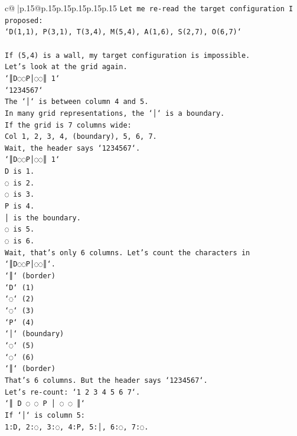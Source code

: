 \documentclass{article}
\begin{document}
{\begin{supertabular}{c@{$\;$}|p{.15\linewidth}@{}p{.15\linewidth}p{.15\linewidth}p{.15\linewidth}p{.15\linewidth}p{.15\linewidth}}
{{{\texttt{Let me re{-}read the target configuration I proposed:} \\
\texttt{`D(1,1), P(3,1), T(3,4), M(5,4), A(1,6), S(2,7), O(6,7)`} \\
\\ 
\texttt{If (5,4) is a wall, my target configuration is impossible.} \\
\texttt{Let's look at the grid again.} \\
\texttt{`║D◌◌P│◌◌║ 1`} \\
\texttt{`1234567`} \\
\texttt{The `│` is between column 4 and 5.} \\
\texttt{In many grid representations, the `│` is a boundary.} \\
\texttt{If the grid is 7 columns wide:} \\
\texttt{Col 1, 2, 3, 4, (boundary), 5, 6, 7.} \\
\texttt{Wait, the header says `1234567`.} \\
\texttt{`║D◌◌P│◌◌║ 1`} \\
\texttt{D is 1.} \\
\texttt{◌ is 2.} \\
\texttt{◌ is 3.} \\
\texttt{P is 4.} \\
\texttt{│ is the boundary.} \\
\texttt{◌ is 5.} \\
\texttt{◌ is 6.} \\
\texttt{Wait, that's only 6 columns. Let's count the characters in `║D◌◌P│◌◌║`.} \\
\texttt{`║` (border)} \\
\texttt{`D` (1)} \\
\texttt{`◌` (2)} \\
\texttt{`◌` (3)} \\
\texttt{`P` (4)} \\
\texttt{`│` (boundary)} \\
\texttt{`◌` (5)} \\
\texttt{`◌` (6)} \\
\texttt{`║` (border)} \\
\texttt{That's 6 columns. But the header says `1234567`.} \\
\texttt{Let's re{-}count: `1 2 3 4 5 6 7`.} \\
\texttt{`║ D ◌ ◌ P │ ◌ ◌ ║`} \\
\texttt{If `│` is column 5:} \\
\texttt{1:D, 2:◌, 3:◌, 4:P, 5:│, 6:◌, 7:◌.} \\
}}}
\end{supertabular}}
\end{document}
